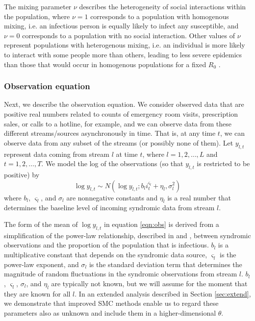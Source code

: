 \documentclass{elsarticle}
\begin{document}
The mixing parameter $\nu$ describes the heterogeneity of social interactions within the population, where $\nu = 1$ corresponds to a population with homogenous mixing, i.e. an infectious person is equally likely to infect any susceptible, and $\nu = 0$ corresponds to a population with no social interaction. Other values of $\nu$ represent populations with heterogenous mixing, i.e. an individual is more likely to interact with some people more than others, leading to less severe epidemics than those that would occur in homogenous populations for a fixed $R_0$ \citep{stroud2006powerlaw, novozhilov2008hetero}.

\subsubsection{Observation equation \label{sec:obs}}

Next, we describe the observation equation. We consider observed data that are positive real numbers related to counts of emergency room visits, prescription sales, or calls to a hotline, for example, and we can observe data from these different streams/sources asynchronously in time. That is, at any time $t$, we can observe data from any subset of the streams (or possibly none of them). Let $y_{l,t}$ represent data coming from stream $l$ at time $t$, where $l = 1,2,\ldots,L$ and $t = 1,2,\ldots,T$. We model the log of the observations (so that $y_{l,t}$ is restricted to be positive) by
\begin{equation}
\log y_{l,t} \sim N\left(\log y_{l,t};b_li_t^{\varsigma_l} + \eta_l,\sigma_l^2\right) \label{eqn:obs}
\end{equation}
where $b_l$, $\varsigma_l$, and $\sigma_l$ are nonnegative constants \citep{skvortsov2012monitoring} and $\eta_l$ is a real number that determines the baseline level of incoming syndromic data from stream $l$.

The form of the mean of $\log y_{l,t}$ in equation \eqref{eqn:obs} is derived from a simplification of the power-law relationship, described in \citet{skvortsov2012monitoring} and \citet{Gins:Mohe:Pate:Bram:Smol:Bril:dete:2009}, between syndromic observations and the proportion of the population that is infectious. $b_l$ is a multiplicative constant that depends on the syndromic data source, $\varsigma_l$ is the power-law exponent, and $\sigma_l$ is the standard deviation term that determines the magnitude of random fluctuations in the syndromic observations from stream $l$. $b_l$, $\varsigma_l$, $\sigma_l$, and $\eta_l$ are typically not known, but we will assume for the moment that they are known for all $l$. In an extended analysis described in Section \ref{sec:extend}, we demonstrate that improved SMC methods enable us to regard these parameters also as unknown and include them in a higher-dimensional $\theta$.
\end{document}
